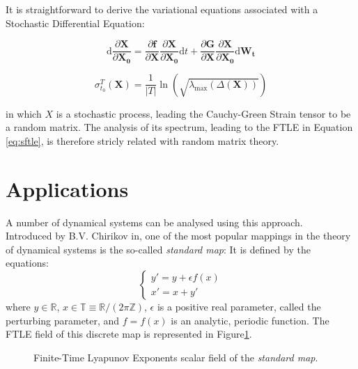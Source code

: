 \documentclass{juliacon}
\newcommand{\drv}{\textrm{d}}
\begin{document}
It is straightforward to derive the variational equations associated with a Stochastic Differential Equation:

\begin{equation}
\drv \frac{\partial \mathbf{X}}{\partial \mathbf{X_0}}=
\frac{\partial \mathbf{f}}{\partial \mathbf{X}}
\frac{\partial \mathbf{X}}{\partial \mathbf{X_0}} \drv t
+
\frac{\partial \mathbf{G}}{\partial \mathbf{X}}
\frac{\partial \mathbf{X}}{\partial \mathbf{X_0}} \drv \mathbf{W_t}
\end{equation}

\begin{equation}
    \label{eq:sftle}
    \sigma_{t_0}^T(\mathbf{X})=\frac{1}{|T|}\ln(\sqrt{\lambda_{\max}(\Delta(\mathbf{X}))})
\end{equation}

in which $X$ is a stochastic process, leading the Cauchy-Green Strain tensor to be a random matrix. The analysis
of its spectrum, leading to the FTLE in Equation \eqref{eq:sftle}, is therefore stricly related with random matrix theory\cite{potters_bouchaud_2020}.

\section{Applications}
A number of dynamical systems can be analysed using this approach. \\
Introduced by B.V. Chirikov in\cite{CHIRIKOV1979263}, one of the most popular mappings in the theory of dynamical systems is the so-called \emph{standard map}\cite{celletti}:
It is defined by the equations:
\begin{equation}
    \begin{cases}
    y'=y+\epsilon f(x) \\
    x'=x+y'
\end{cases}
\end{equation}
where $y\in\mathbb{R}$, $x\in\mathbb{T}\equiv \mathbb{R}/(2\pi\mathbb{Z})$, $\epsilon$ is a positive real parameter, called the perturbing parameter, and $f = f(x)$ is an analytic, periodic function.
The FTLE field of this discrete map is represented in Figure\ref{fig:stdmap}.

\begin{figure}[h]
    \centering
    \caption{Finite-Time Lyapunov Exponents scalar field of the \emph{standard map}.}\label{fig:stdmap}
\end{figure}
\end{document}

